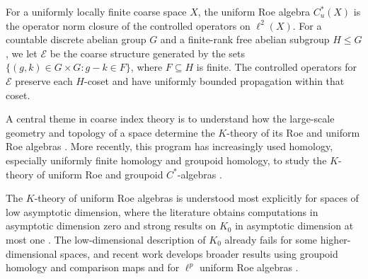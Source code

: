 \documentclass[pdflatex,sn-mathphys-num]{sn-jnl}%
\theoremstyle{plain}
\theoremstyle{remark}
\theoremstyle{definition}
\numberwithin{equation}{section}
\begin{document}

For a uniformly locally finite coarse space \( X \), the uniform Roe algebra \( C_u^*(X) \) is the operator norm closure of the controlled operators on \( \ell^2(X) \). For a countable discrete abelian group \( G \) and a finite-rank free abelian subgroup \( H\leq G \), we let \( \mathcal E \) be the coarse structure generated by the sets \( \{(g,k)\in G\times G:g-k\in F\} \), where \( F\subseteq H \) is finite. The controlled operators for \( \mathcal E \) preserve each \( H \)-coset and have uniformly bounded propagation within that coset.


A central theme in coarse index theory is to understand how the large-scale geometry and topology of a space determine the \( K \)-theory of its Roe and uniform Roe algebras \cite{roe1993coarse,higson1994homotopy,yu1997localization,skandalis2002coarse,Spakula2009,engel2019uniform,engel2019rough,bunke2020coarse}. More recently, this program has increasingly used homology, especially uniformly finite homology and groupoid homology, to study the \( K \)-theory of uniform Roe and groupoid \( C^* \)-algebras \cite{matui2012homology,bonicke2023dynamic,manuilov2024mapping,krutoy2026bijective}.

The \( K \)-theory of uniform Roe algebras is understood most explicitly for spaces of low asymptotic dimension, where the literature obtains computations in asymptotic dimension zero and strong results on \( K_0 \) in asymptotic dimension at most one \cite{winter2010nuclear,li2018classification,li2018low,chung2021structure,bonicke2023dynamic}. The low-dimensional description of \( K_0 \) already fails for some higher-dimensional spaces, and recent work develops broader results using groupoid homology and comparison maps and for \( \ell^p \) uniform Roe algebras \cite{li2018low,chung2021structure,bonicke2023dynamic,manuilov2024mapping,krutoy2026bijective}.
\end{document}
